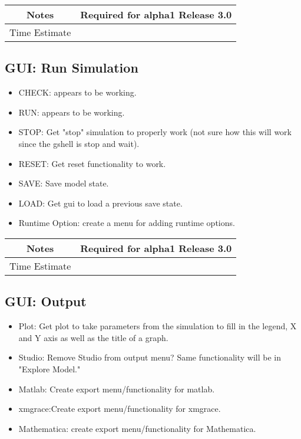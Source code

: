 \documentclass[12pt]{article}
\begin{document}
{
  \vspace{5mm}
  \centering
  \begin{tabular}{|c|c|}
    \hline
    Notes
    & Required for alpha1 Release 3.0 \\
    \hline
    Time Estimate
    & \\
    \hline
  \end{tabular}
}


\subsection{GUI: Run Simulation}
\begin{itemize}
\item CHECK: appears to be working.
\item RUN: appears to be working.      
\item STOP: Get "stop" simulation to properly work (not sure how this
  will work since the gshell is stop and wait).
\item RESET: Get reset functionality to work.
\item SAVE: Save model state.
\item LOAD: Get gui to load a previous save state.
\item Runtime Option: create a menu for adding runtime options.
\end{itemize}

{
  \vspace{5mm}
  \centering
  \begin{tabular}{|c|c|}
    \hline
    Notes
    & Required for alpha1 Release 3.0 \\
    \hline
    Time Estimate
    & \\
    \hline
  \end{tabular}
}


\subsection{GUI: Output}
\begin{itemize}
\item Plot: Get plot to take parameters from the simulation to fill in
  the legend, X and Y axis as well as the title of a graph.
\item Studio: Remove Studio from output menu? Same functionality will be in "Explore Model."
\item Matlab: Create export menu/functionality for matlab.
\item xmgrace:Create export menu/functionality for xmgrace.
\item Mathematica: create export menu/functionality for Mathematica.
\end{itemize}
\end{document}
